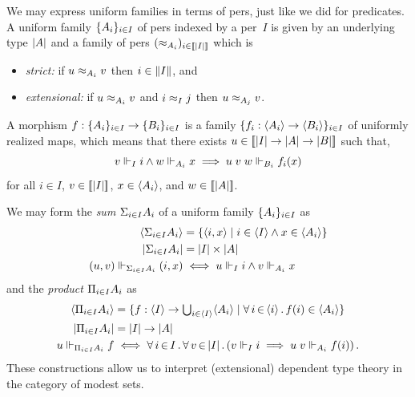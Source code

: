 We may express uniform families in terms of pers, just like we did for
predicates. A uniform family $\{A_i\}_{i \in I}$ of pers indexed
by a per~$I$ is given by an underlying type $|A|$ and a family
of pers $(\approx_{A_i})_{i \in [\![|I|]\!]}$ which is
% 
\begin{itemize}
\item \emph{strict:} if $u \approx_{A_i} v$ then $i \in \|I\|$, and
\item \emph{extensional:} if $u \approx_{A_i} v$ and $i \approx_I j$ then $u
  \approx_{A_j} v$.
\end{itemize}
%
A morphism $f : \{A_i\}_{i \in I} \to \{B_i\}_{i \in I}$ is a
family $\{f_i : \langle A_i \rangle \to \langle B_i \rangle\}_{i \in I}$ of
uniformly realized maps, which means that there exists $u \in
[\![|I| \to |A| \to |B|]\!]$ such that,
%
\begin{equation*}
  v \Vdash_I i \land w \Vdash_{A_i} x \implies u\; v \; w \Vdash_{B_i} f_i(x)
\end{equation*}
%
for all $i \in I$, $v \in [\![|I|]\!]$, $x \in \langle A_i \rangle$,
and $w \in [\![|A|]\!]$.

We may form the \emph{sum} ${\Sigma_{i \in I} A_i}$ of a uniform family
$\{A_i\}_{i \in I}$ as
%
\begin{align*}
  \langle {\Sigma_{i \in I} A_i} \rangle &=
  \{\langle i,x \rangle \mid i \in \langle I \rangle \land x \in \langle A_i \rangle\}
  \\
  |{\Sigma_{i \in I} A_i}| &=
  |I| \times |A|
  \\
  (u,v) \Vdash_{{\Sigma_{i \in I} A_i}} (i,x)
  &\iff
  u \Vdash_I i \land v \Vdash_{A_i} x
\end{align*}
%
and the \emph{product} ${\Pi_{i \in I} A_i}$ as
%
\begin{align*}
  \langle {\Pi_{i \in I} A_i} \rangle &=
  \{f : \langle I \rangle \to {\textstyle \bigcup_{i \in \langle I \rangle} \langle A_i \rangle} \mid
    \forall\, i \,{\in}\, \langle i \rangle\,.\,f(i) \in \langle A_i \rangle\}
  \\
  |{\Pi_{i \in I} A_i}| &=
  |I| \to |A|
  \\
  u \Vdash_{{\Pi_{i \in I} A_i}} f
  &\iff
  \forall\, i \,{\in}\, I\,.\,\forall\, v \,{\in}\, |I|\,.\left(
      v \Vdash_I i \implies
      u \; v \Vdash_{A_i} f(i)
    \right).
\end{align*}
%
These constructions allow us to interpret (extensional) dependent type
theory in the category of modest sets.

